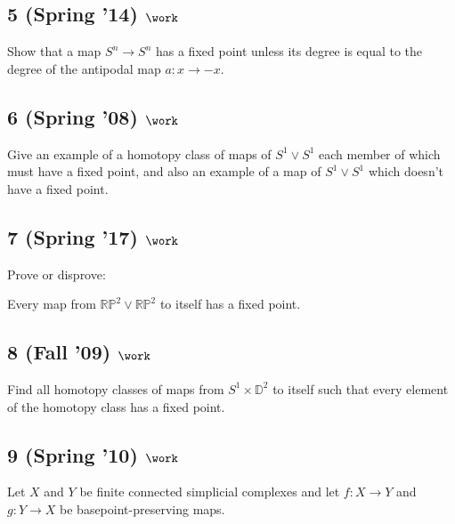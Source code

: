\hypertarget{spring-14-work-3}{%
\subsection{\texorpdfstring{5 (Spring '14)
\(\work\)}{5 (Spring '14) \textbackslash work}}\label{spring-14-work-3}}

Show that a map \(S^n \to S^n\) has a fixed point unless its degree is
equal to the degree of the antipodal map \(a : x \to -x\).

\hypertarget{spring-08-work-3}{%
\subsection{\texorpdfstring{6 (Spring '08)
\(\work\)}{6 (Spring '08) \textbackslash work}}\label{spring-08-work-3}}

Give an example of a homotopy class of maps of \(S^1 \lor S^1\) each
member of which must have a fixed point, and also an example of a map of
\(S^1 \lor S^1\) which doesn't have a fixed point.

\hypertarget{spring-17-work-2}{%
\subsection{\texorpdfstring{7 (Spring '17)
\(\work\)}{7 (Spring '17) \textbackslash work}}\label{spring-17-work-2}}

Prove or disprove:

Every map from \({\mathbb{RP}}^2 \lor {\mathbb{RP}}^2\) to itself has a
fixed point.

\hypertarget{fall-09-work-1}{%
\subsection{\texorpdfstring{8 (Fall '09)
\(\work\)}{8 (Fall '09) \textbackslash work}}\label{fall-09-work-1}}

Find all homotopy classes of maps from \(S^1 \times {\mathbb{D}}^2\) to
itself such that every element of the homotopy class has a fixed point.

\hypertarget{spring-10-work}{%
\subsection{\texorpdfstring{9 (Spring '10)
\(\work\)}{9 (Spring '10) \textbackslash work}}\label{spring-10-work}}

Let \(X\) and \(Y\) be finite connected simplicial complexes and let
\(f : X \to Y\) and \(g : Y \to X\) be basepoint-preserving maps.

